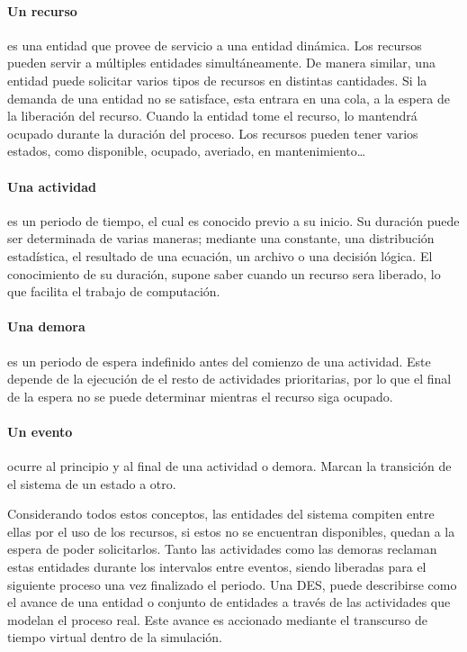 \paragraph{Un recurso}
es una entidad
que provee de servicio a una entidad dinámica.
Los recursos pueden servir a múltiples entidades simultáneamente.
De manera similar, una entidad puede
solicitar varios tipos de recursos en distintas cantidades.
Si la demanda de una entidad no se satisface,
esta entrara en una cola,
a la espera de la liberación del recurso.
Cuando la entidad tome el recurso,
lo mantendrá ocupado durante la duración del proceso.
Los recursos pueden tener varios estados,
como disponible, ocupado, averiado, en mantenimiento\ldots

\paragraph{Una actividad}
es un periodo de tiempo,
el cual es conocido previo a su inicio.
Su duración puede ser determinada de varias maneras;
mediante una constante, una distribución estadística,
el resultado de una ecuación, un archivo o una decisión lógica.
El conocimiento de su duración,
supone saber cuando un recurso sera liberado,
lo que facilita el trabajo de computación.

\paragraph{Una demora}
es un periodo de espera indefinido
antes del comienzo de una actividad.
Este depende de la ejecución
de el resto de actividades prioritarias,
por lo que el final de la espera no se puede determinar
mientras el recurso siga ocupado.

\paragraph{Un evento}
ocurre al principio y al final de una actividad o demora.
Marcan la transición de el sistema de un estado a otro.

Considerando todos estos conceptos,
las entidades del sistema compiten entre ellas por el uso de los recursos,
si estos no se encuentran disponibles, quedan a la espera de poder solicitarlos.
Tanto las actividades como las demoras reclaman estas entidades
durante los intervalos entre eventos,
siendo liberadas para el siguiente proceso una vez finalizado el periodo.
Una DES, puede describirse como el avance de una entidad o conjunto de entidades
a través  de las actividades que modelan el proceso real.
Este avance es accionado
mediante el transcurso de tiempo virtual dentro de la simulación.

